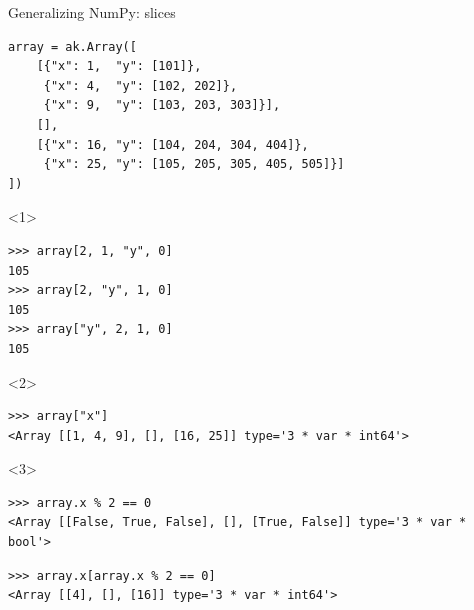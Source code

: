 \documentclass[aspectratio=169]{beamer}
\begin{document}
\begin{frame}[fragile]{Generalizing NumPy: slices}
\vspace{0.25 cm}

\begin{verbatim}
array = ak.Array([
    [{"x": 1,  "y": [101]},
     {"x": 4,  "y": [102, 202]},
     {"x": 9,  "y": [103, 203, 303]}],
    [],
    [{"x": 16, "y": [104, 204, 304, 404]},
     {"x": 25, "y": [105, 205, 305, 405, 505]}]
])
\end{verbatim}

\begin{onlyenv}<1>
\vspace{0.25 cm}
\begin{verbatim}
>>> array[2, 1, "y", 0]
105
>>> array[2, "y", 1, 0]
105
>>> array["y", 2, 1, 0]
105
\end{verbatim}
\vspace{5 cm}
\end{onlyenv}

\begin{onlyenv}<2>
\vspace{0.25 cm}
\begin{verbatim}
>>> array["x"]
<Array [[1, 4, 9], [], [16, 25]] type='3 * var * int64'>
\end{verbatim}
\vspace{5 cm}
\end{onlyenv}

\begin{onlyenv}<3>
\vspace{0.25 cm}
\begin{verbatim}
>>> array.x % 2 == 0
<Array [[False, True, False], [], [True, False]] type='3 * var * bool'>
\end{verbatim}

\vspace{0.25 cm}
\begin{verbatim}
>>> array.x[array.x % 2 == 0]
<Array [[4], [], [16]] type='3 * var * int64'>
\end{verbatim}
\vspace{5 cm}
\end{onlyenv}
\end{frame}
\end{document}
